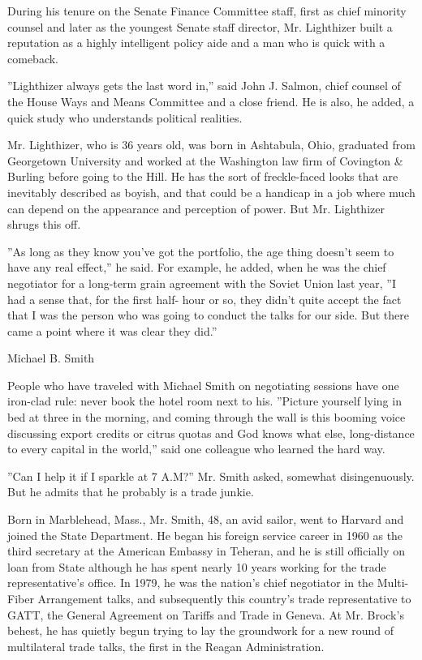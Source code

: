 During his tenure on the Senate Finance Committee staff, first as chief
minority counsel and later as the youngest Senate staff director, Mr.
Lighthizer built a reputation as a highly intelligent policy aide and a
man who is quick with a comeback.

''Lighthizer always gets the last word in,'' said John J. Salmon, chief
counsel of the House Ways and Means Committee and a close friend. He is
also, he added, a quick study who understands political realities.

Mr. Lighthizer, who is 36 years old, was born in Ashtabula, Ohio,
graduated from Georgetown University and worked at the Washington law
firm of Covington \& Burling before going to the Hill. He has the sort
of freckle-faced looks that are inevitably described as boyish, and that
could be a handicap in a job where much can depend on the appearance and
perception of power. But Mr. Lighthizer shrugs this off.

''As long as they know you've got the portfolio, the age thing doesn't
seem to have any real effect,'' he said. For example, he added, when he
was the chief negotiator for a long-term grain agreement with the Soviet
Union last year, ''I had a sense that, for the first half- hour or so,
they didn't quite accept the fact that I was the person who was going to
conduct the talks for our side. But there came a point where it was
clear they did.''

Michael B. Smith

People who have traveled with Michael Smith on negotiating sessions have
one iron-clad rule: never book the hotel room next to his. ''Picture
yourself lying in bed at three in the morning, and coming through the
wall is this booming voice discussing export credits or citrus quotas
and God knows what else, long-distance to every capital in the world,''
said one colleague who learned the hard way.

''Can I help it if I sparkle at 7 A.M?'' Mr. Smith asked, somewhat
disingenuously. But he admits that he probably is a trade junkie.

Born in Marblehead, Mass., Mr. Smith, 48, an avid sailor, went to
Harvard and joined the State Department. He began his foreign service
career in 1960 as the third secretary at the American Embassy in
Teheran, and he is still officially on loan from State although he has
spent nearly 10 years working for the trade representative's office. In
1979, he was the nation's chief negotiator in the Multi- Fiber
Arrangement talks, and subsequently this country's trade representative
to GATT, the General Agreement on Tariffs and Trade in Geneva. At Mr.
Brock's behest, he has quietly begun trying to lay the groundwork for a
new round of multilateral trade talks, the first in the Reagan
Administration.

